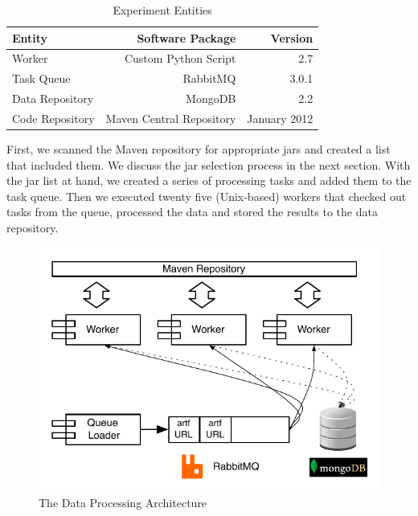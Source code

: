 \documentclass[conference]{llncs}
\begin{document}
\begin{table}
\centering
\begin{threeparttable}
\caption{Experiment Entities}
\label{tbl:exp}
\begin{tabular}{l r r}
\hline
Entity & Software Package & Version\\
\hline
Worker & Custom Python Script & 2.7\\
Task Queue & RabbitMQ & 3.0.1 \\
Data Repository & MongoDB & 2.2 \\
Code Repository & Maven Central Repository & January 2012 \\
\hline
\end{tabular}
\end{threeparttable}
\end{table}

First, we scanned the Maven repository for appropriate {\sc jar}s and created a
list that included them. We discuss the {\sc jar} selection process in the next 
section. With the {\sc jar} list at hand, we created a series of processing tasks
and added them to the task queue. Then we executed twenty five (Unix-based)
workers that checked out tasks from the queue, processed the data and stored the
results to the data repository.

\begin{figure}[t]
  \begin{center}
    \includegraphics[scale=0.7]{figures/arch.pdf}
  \end{center}
  \caption{The Data Processing Architecture}
  \label{fig:arch}
\end{figure}
\end{document}
